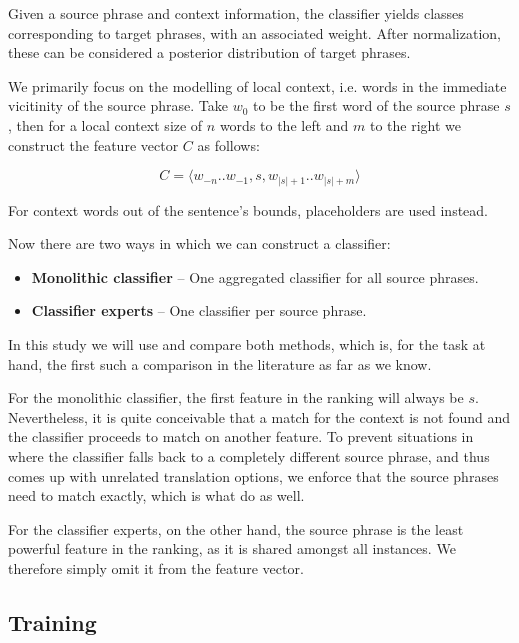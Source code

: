 \documentclass[11pt]{article}
\theoremstyle{break}
\begin{document}
Given a source phrase and context information, the classifier yields classes
corresponding to target phrases, with an associated weight. After
normalization, these can be considered a posterior distribution of
target phrases. 

We primarily focus on the modelling of local context, i.e. words in the
immediate vicitinity of the source phrase. Take $w_0$ to be the first word of
the source phrase $s$, then for a local context size of $n$ words to the left and
$m$ to the right we construct the feature vector $C$ as follows:

\begin{equation}
  C = \langle w_{-n} .. w_{-1} , s , w_{|s|+1} .. w_{|s|+m} \rangle
\end{equation}

For context words out of the sentence's bounds, placeholders are used instead.

Now there are two ways in which we can construct a classifier:

\begin{itemize}
  \item \textbf{Monolithic classifier} -- One aggregated classifier for all
    source phrases.
  \item \textbf{Classifier experts} -- One classifier per source phrase.
\end{itemize}

In this study we will use and compare both methods, which is, for the task at
hand, the first such a comparison in the literature as far as we know.

For the monolithic classifier, the first feature in the ranking will always be
$s$. Nevertheless, it is quite conceivable that a match for the context is not
found and the classifier proceeds to match on another feature. To prevent
situations in where the classifier falls back to a completely different source
phrase, and thus comes up with unrelated translation options, we enforce that
the source phrases need to match exactly, which is what \cite{Stroppa+07} do as
well.

For the classifier experts, on the other hand, the source phrase is the least
powerful feature in the ranking, as it is shared amongst all instances. We
therefore simply omit it from the feature vector.

\subsection{Training}
\end{document}
